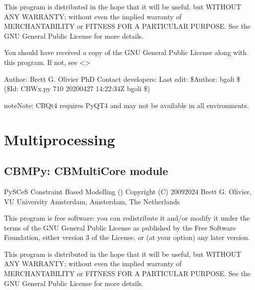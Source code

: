 \documentclass[letterpaper,12pt,english]{sphinxmanual}
\begin{document}
\sphinxAtStartPar
This program is distributed in the hope that it will be useful,
but WITHOUT ANY WARRANTY; without even the implied warranty of
MERCHANTABILITY or FITNESS FOR A PARTICULAR PURPOSE.  See the
GNU General Public License for more details.

\sphinxAtStartPar
You should have received a copy of the GNU General Public License
along with this program.  If not, see \textless{}\textgreater{}

\sphinxAtStartPar
Author: Brett G. Olivier PhD
Contact developers: 
Last edit: \$Author: bgoli \$ (\$Id: CBWx.py 710 2020\sphinxhyphen{}04\sphinxhyphen{}27 14:22:34Z bgoli \$)

\begin{sphinxadmonition}{note}{Note:}
\sphinxAtStartPar
CBQt4 requires PyQT4 and may not be available in all environments.
\end{sphinxadmonition}


\section{Multi\sphinxhyphen{}processing}
\label{\detokenize{api/visualization:multi-processing}}

\subsection{CBMPy: CBMultiCore module}
\label{\detokenize{api/visualization:cbmpy-cbmulticore-module}}\label{\detokenize{api/visualization:module-cbmpy.CBMultiCore}}
\sphinxAtStartPar
PySCeS Constraint Based Modelling ()
Copyright (C) 2009\sphinxhyphen{}2024 Brett G. Olivier, VU University Amsterdam, Amsterdam, The Netherlands

\sphinxAtStartPar
This program is free software: you can redistribute it and/or modify
it under the terms of the GNU General Public License as published by
the Free Software Foundation, either version 3 of the License, or
(at your option) any later version.

\sphinxAtStartPar
This program is distributed in the hope that it will be useful,
but WITHOUT ANY WARRANTY; without even the implied warranty of
MERCHANTABILITY or FITNESS FOR A PARTICULAR PURPOSE.  See the
GNU General Public License for more details.
\end{document}
